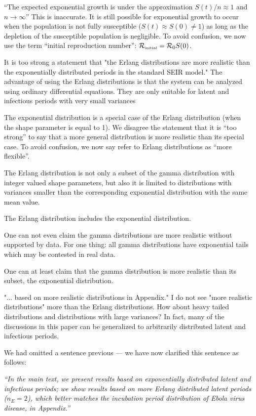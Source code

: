 \documentclass[12pt]{article}
\newcommand{\Rx}[1]{\ensuremath{{\cal R}_{#1}}}
\newcommand{\Ro}{\Rx{0}}
\newcommand{\Rini}{\Rx{\textrm{\tiny initial}}}
\newcommand{\revtext}{\textsf}
\newcommand{\newtext}[1]{\textsl{``#1''}}
\begin{document}
``The expected exponential growth is under the approximation $S(t)/n \approx 1$ and
$n \to \infty$'' 
This is inaccurate.
It is still possible for exponential growth to occur when the population is not fully susceptible ($S(t) \approx S(0) \neq 1$) as long as the depletion of the susceptible population is negligible.
To avoid confusion, we now use the term ``initial reproduction number'': $\Rini = \Ro S(0)$.

\revtext{
 It is too strong a statement that "the Erlang distributions are
more realistic than the exponentially distributed periods in the standard
SEIR model." The advantage of using the Erlang distributions is that the
system can be analyzed using ordinary differential equations. They are
only suitable for latent and infectious periods with very small variances
}

The exponential distribution is a special case of the Erlang distribution (when the shape parameter is equal to 1).
We disagree the statement that it is ``too strong'' to say that a more general distribution is more realistic than its special case.
To avoid confusion, we now say refer to Erlang distributions as ``more flexible''.

\revtext{
The Erlang distribution is not only a subset of the gamma distribution with integer valued shape parameters, but also it is limited to distributions with variances smaller than the corresponding exponential distribution with the same mean value.
}

The Erlang distribution includes the exponential distribution.

\revtext{
One can not even claim the gamma distributions are more realistic
without supported by data. For one thing: all gamma distributions
have exponential tails which may be contested in real data.
}

One can at least claim that the gamma distribution is more realistic than its subset, the exponential distribution.

\revtext{
"... based on more realistic distributions in Appendix." I do
not see "more realistic distributions" more than the Erlang distributions.
How about heavy tailed distributions and distributions with large variances? In fact, many of the discussions in this paper can be generalized
to arbitrarily distributed latent and infectious periods.
}

We had omitted a sentence previous --- we have now clarified this sentence as follows:

\newtext{In the main text, we present results based on exponentially distributed latent and infectious periods;
we show results based on more Erlang distributed latent periods ($n_E=2$), which better matches the incubation period distribution of Ebola virus disease, in Appendix.}
\end{document}
